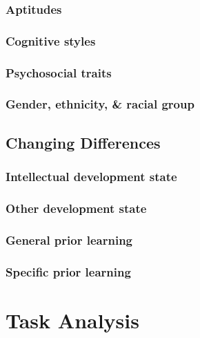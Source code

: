 \documentclass[12pt]{report} %
\begin{document}
\subsection{Aptitudes}

\subsection{Cognitive styles}

\subsection{Psychosocial traits}

\subsection{Gender, ethnicity, \& racial group}


\section{Changing Differences}

\subsection{Intellectual development state}

\subsection{Other development state}

\subsection{General prior learning}

\subsection{Specific prior learning}


\chapter{Task Analysis}
\end{document}
